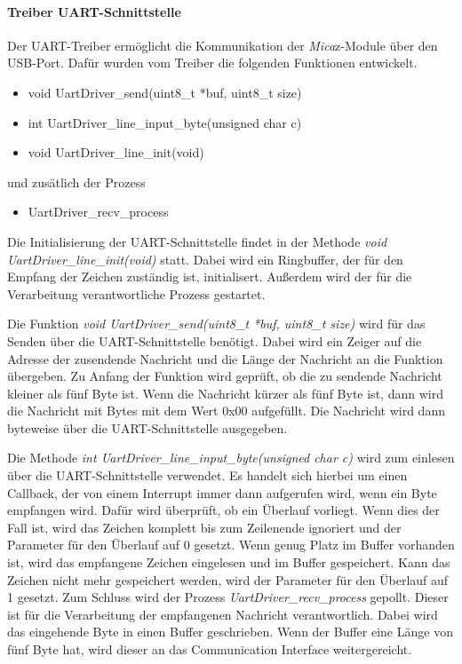 \paragraph{Treiber UART-Schnittstelle}
Der UART-Treiber ermöglicht die Kommunikation der \textit{Mica}z-Module über den USB-Port. Dafür wurden vom Treiber die folgenden Funktionen entwickelt.
\begin{itemize}
  \item void UartDriver\_send(uint8\_t *buf, uint8\_t size)
  \item int UartDriver\_line\_input\_byte(unsigned char c)
  \item void UartDriver\_line\_init(void)
\end{itemize}
und zusätlich der Prozess
\begin{itemize}
  \item UartDriver\_recv\_process
\end{itemize}

Die Initialisierung der UART-Schnittstelle findet in der Methode \textit{void UartDriver\_line\_init(void)} statt. Dabei wird ein Ringbuffer, der für den Empfang der Zeichen zuständig ist, initialisert. Außerdem wird der für die Verarbeitung verantwortliche Prozess gestartet.

Die Funktion \textit{void UartDriver\_send(uint8\_t *buf, uint8\_t size)} wird für das Senden über die UART-Schnittstelle benötigt. Dabei wird ein Zeiger auf die Adresse der zusendende Nachricht und die Länge der Nachricht an die Funktion übergeben. Zu Anfang der Funktion wird geprüft, ob die zu sendende Nachricht kleiner als fünf Byte ist. Wenn die Nachricht kürzer als fünf Byte ist, dann wird die Nachricht mit Bytes mit dem Wert 0x00 aufgefüllt. Die Nachricht wird dann byteweise über die UART-Schnittstelle ausgegeben.

Die Methode \textit{int UartDriver\_line\_input\_byte(unsigned char c)} wird zum einlesen über die UART-Schnittstelle verwendet. Es handelt sich hierbei um einen Callback, der von einem Interrupt immer dann aufgerufen wird, wenn ein Byte empfangen wird. Dafür wird überprüft, ob ein Überlauf vorliegt. Wenn dies der Fall ist, wird das Zeichen komplett bis zum Zeilenende ignoriert und der Parameter für den Überlauf auf 0 gesetzt. Wenn genug Platz im Buffer vorhanden ist, wird das empfangene Zeichen eingelesen und im Buffer gespeichert. Kann das Zeichen nicht mehr gespeichert werden, wird der Parameter für den Überlauf auf 1 gesetzt. Zum Schluss wird der Prozess \textit{UartDriver\_recv\_process} gepollt. Dieser ist für die Verarbeitung der empfangenen Nachricht verantwortlich. Dabei wird das eingehende Byte in einen Buffer geschrieben. Wenn der Buffer eine Länge von fünf Byte hat, wird dieser an das Communication Interface weitergereicht.

